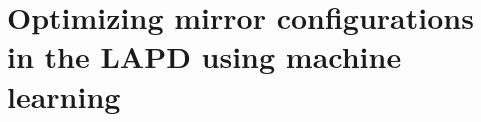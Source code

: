\graphicspath{{Chapters/Chapter_isat-predict/}}

\chapter{Optimizing mirror configurations in the LAPD using machine learning}
\label{ch:isat-predict}

%
%
%
%
%
%
%
%
%
%



